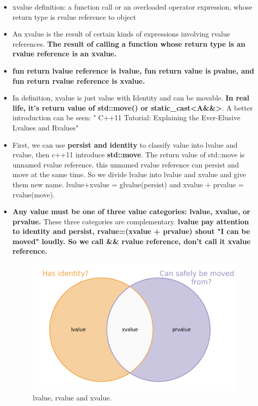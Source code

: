 \documentclass[a4paper,11pt,twoside]{book}
\begin{document}
\begin{itemize}
	\item xvalue definition: a function call or an overloaded operator expression, whose return type is rvalue reference to object
	
	\item An xvalue is the result of certain kinds of expressions involving rvalue references. \textbf{The result of calling a function whose return type is an rvalue reference is an xvalue.}
	
	\item \textbf{fun return lvalue reference is lvalue, fun return value is pvalue, and fun return rvalue reference is xvalue.}
	
	\item In definition,  xvalue is just value with Identity and can be movable. \textbf{In real life, it's  return value of std::move() or static\_cast<A\&\&>}. A better introduction can be seen: " C++11 Tutorial: Explaining the Ever-Elusive Lvalues and Rvalues"
	
	
	\item First, we can use \textbf{persist and identity} to classify value into lvalue and rvalue, then c++11 introduce \textbf{std::move}. The return value of std::move is unnamed rvalue reference. this unnamed rvalue reference can persist and move at the same time.  So we divide lvalue into lvalue and xvalue and give them new name.  lvalue+xvalue = glvalue(persist)  and xvalue + prvalue = rvalue(move).
	
	\item \textbf{Any value must be one of three value categories: lvalue, xvalue, or prvalue.} These three categories are complementary.  \textbf{lvalue pay attention to  identity and persist, rvalue=(xvalue + prvalue) shout "I can be moved" loudly.  So we call \&\& rvalue reference, don't call it xvalue reference. }
	
	\begin{figure}[h]
		\centering
		\includegraphics[width=0.4\linewidth]{pics/xvalue1.png}
		\caption{lvalue, rvalue and xvalue.}
		\label{fig:xvalue1}
	\end{figure}
	

\end{itemize}
\end{document}
